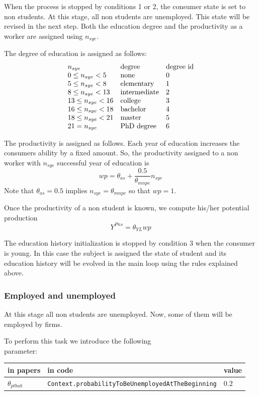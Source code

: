 \documentclass{book}
\begin{document}
When the process is stopped by conditions 1 or 2, the consumer state is set to non students. At this stage, all non students are unemployed. This state will be revised in the next step. Both the education degree and the productivity as a worker are assigned using $n_{sye}$. 

The degree of education is assigned as follows:
\[
	\begin{array}{l l l}
		n_{sye}& \textnormal{degree}& \textnormal{degree id}\\
	0\le n_{sye}<5 & \textnormal{none}&0\\
	5\le n_{sye}<8 & \textnormal{elementary}&1\\
	8\le n_{sye}<13 & \textnormal{intermediate}&2\\
	13\le n_{sye}<16 & \textnormal{college}&3\\
	16\le n_{sye}<18 & \textnormal{bachelor}&4\\
	18\le n_{sye}<21 & \textnormal{master}&5\\
	21= n_{sye} & \textnormal{PhD degree}&6
	\end{array}
\]

The productivity is assigned as follows. Each year of education increases the consumers ability by a fixed amount. So, the productivity assigned to a non worker with  $n_{sye}$ successful year of education is
\[
	wp=\theta_{as}+\frac{0.5}{\theta_{mnpe}}n_{sye}
\]
Note that $\theta_{as}=0.5$ implies $n_{sye}=\theta_{mnpe}$ so that $wp=1$.

Once the productivity of a non student is known, we compute his/her potential production 
\[Y^{Pns}=\theta_{YL}wp\]

The education history initialization is stopped by condition 3 when the consumer is young. In this case the subject is assigned the state of student and its education history will be evolved in the main loop using the rules explained above.

\subsubsection*{Employed and unemployed}

At this stage all non students are unemployed. Now, some of them will be employed by firms. 

To perform this task we introduce the following\\
parameter:\\
\begin{tabular}{l l l}
	\hline
	in papers& in code&value\\
	\hline
	\hline
 $\theta_{ptbub}$&\verb+Context.probabilityToBeUnemployedAtTheBeginning+&$0.2$\\
	\hline
\end{tabular}
\end{document}
